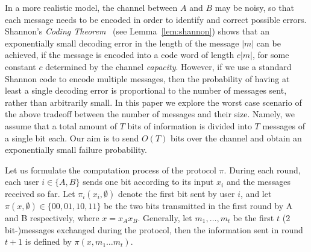 \documentclass[ letterpaper, 11pt]{article}
\begin{document}
In a more realistic model, the channel between $A$ and $B$ may be noisy, so that each message
needs to be encoded in order to identify and correct possible errors.
Shannon's \emph{Coding Theorem}~\cite{shannon48} (see Lemma~\ref{lem:shannon})
shows that an exponentially small decoding error in the length of the message $|m|$
can be achieved, if the message is encoded into a code word of length $c|m|$,
for some constant $c$
determined by the channel \emph{capacity}.
However, if we use a standard Shannon code to encode multiple messages,
then the probability of having at least a single decoding error
is proportional to the number of messages sent, rather than arbitrarily small.
In this paper we explore the worst case scenario of the above tradeoff between the
number of messages and their size.
Namely, we assume that a total amount of $T$ bits of information  is divided into
$T$ messages of a single bit each. Our aim is to send $O(T)$ bits over the channel
and obtain an exponentially small failure probability.


Let us formulate the computation process of the protocol $\pi$.
During each round, each user $i\in \{A,B\}$ sends one bit according to
its input $x_i$ and the messages received so far. Let $\pi_i(x_i,\emptyset)$
denote the  first bit sent by user $i$, and let $\pi(x,\emptyset)\in \{00,01,10,11\}$ be the
two bits transmitted in the first round by A and B respectively, where $x=x_Ax_B$.
Generally, let $m_1,\ldots,m_t$ be the first $t$ (2 bit-)messages exchanged during the protocol, then the information sent in round $t+1$
is defined by $\pi(x, m_1\ldots m_t)$.
\end{document}
